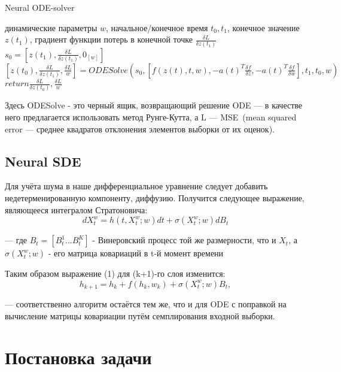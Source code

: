 \documentclass{article}
\begin{document}
    \begin{algorithm}
     \caption{Neural ODE-solver}\label{alg:cap}
     \begin{algorithmic}
    \Require динамические параметры $w$, начальное/конечное время $t_0,t_1$, конечное значение $z(t_1)$, градиент функции потерь в конечной точке $\frac{\delta L}{\delta z(t_1)}$
    \State $s_0 = [z(t_1), \frac{\delta L}{\delta z(t_1)}, 0_{[w]}]$ 
    \State $[z(t_0), \frac{\delta L}{\delta z(t_1)}, \frac{\delta L}{w}] = ODESolve(s_0, [f(z(t), t, w), -a(t)^T \frac{\delta f}{\delta z}, -a(t)^T \frac{\delta f}{\delta w}], t_1, t_0, w)$
    \State $return \frac{\delta L}{\delta z(t_0)}, \frac{\delta L}{w}$ 
\end{algorithmic}
\end{algorithm}
   \par Здесь ODESolve - это черный ящик, возвращающий решение ODE --- в качестве него предлагается использовать метод Рунге-Кутта, а L --- MSE~(mean squared error --- среднее квадратов отклонения элементов выборки от их оценок).
    
   \subsection{Neural SDE}
      \par Для учёта шума в наше дифференциальное уравнение следует добавить недетерменированную компоненту, диффузию. Получится следующее выражение, являющееся интегралом Стратоновича:
      \begin{equation} dX_t^w = h(t, X_t^w; w) dt + \sigma(X_t^w;w) dB_t     \end{equation}
      \par --- где $B_t=[B_t^1...B_t^K]$ - Винеровский процесс той же размерности, что и $X_t$, а $\sigma(X_t^w;w)$ - его матрица ковариаций в t-й момент времени
      \par Таким образом выражение (1) для (k+1)-го слоя изменится:
      \begin{equation} h_{k+1} = h_k + f(h_k, w_k) +  \sigma(X_t^w;w) B_t,    \end{equation}
      \par --- соответственно алгоритм остаётся тем же, что и для ODE с поправкой на вычисление матрицы ковариации путём семплирования входной выборки.

\section{Постановка задачи}
   
\end{document}
